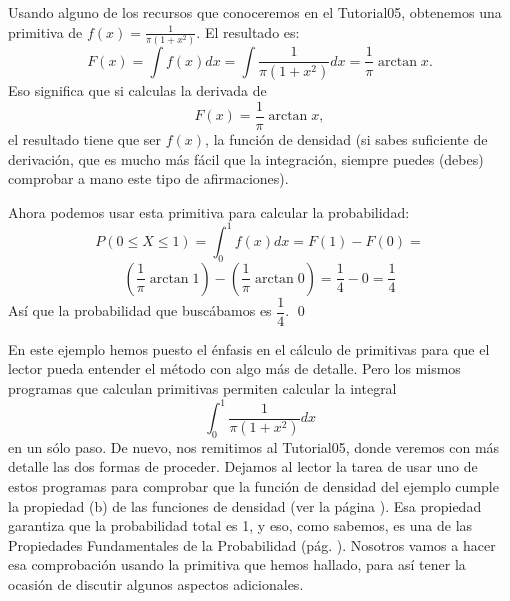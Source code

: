 \begin{ejemplo}
\label{cap05:ejem:CalculoProbabilidadIntegralParte2}
Usando alguno de los recursos que conoceremos en el Tutorial05, obtenemos una primitiva de $f(x)=\frac{1}{\pi(1+x^2)}$. El resultado es:
\[F(x)=\int f(x)dx=\int \frac{1}{\pi(1+x^2)} dx = \dfrac{1}{\pi}\arctan x.\]
Eso significa que si calculas la derivada de
\[F(x)=\dfrac{1}{\pi}\arctan x,\]
el resultado tiene que ser $f(x)$, la función de densidad (si sabes suficiente de derivación, que es mucho más fácil que la integración, siempre puedes (debes) comprobar a mano este tipo de afirmaciones).

Ahora podemos usar esta primitiva para calcular la probabilidad:
    \[
    P(0\leq X\leq 1)=\int_0^1f(x)dx=F(1)-F(0)=\]
    \[\left(\dfrac{1}{\pi}\arctan 1\right)-\left(\dfrac{1}{\pi}\arctan 0\right)=\dfrac{1}{4}-0=\dfrac{1}{4}
    \]
Así que la probabilidad que buscábamos es $\dfrac{1}{4}$.
\qed
\end{ejemplo}
En este ejemplo hemos puesto el énfasis en el cálculo de primitivas para que el lector pueda entender el método con algo más de detalle. Pero los mismos programas que calculan primitivas permiten calcular la integral
\[\int_0^1\dfrac{1}{\pi(1+x^2)}dx\]
en un sólo paso. De nuevo, nos remitimos al Tutorial05, donde veremos con más detalle las dos formas de proceder. Dejamos al lector la tarea de usar uno de estos programas para comprobar que la función de densidad del ejemplo cumple la propiedad (b) de las funciones de densidad (ver la página \pageref{cap05:ecu:AsignacionProbabilidadIntegralDensidad}). Esa propiedad garantiza que la probabilidad total es 1, y eso, como sabemos, es una de las Propiedades Fundamentales de la Probabilidad (pág. \pageref{cap03:def:PropiedadesFundamentalesFuncionProbabilidad}). Nosotros vamos a hacer esa comprobación usando la primitiva que hemos hallado, para así tener la ocasión de discutir algunos aspectos adicionales.

